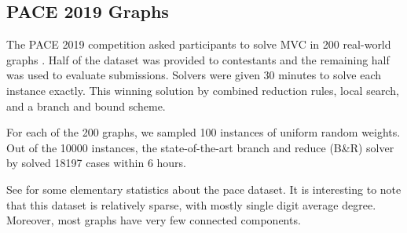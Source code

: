 \documentclass{article}
\begin{document}
\subsection{PACE 2019 Graphs}
The PACE 2019 competition asked participants to solve MVC in 200 real-world graphs \citet{pace2019}.
Half of the dataset was provided to contestants and the remaining half was used to evaluate submissions.
Solvers were given 30 minutes to solve each instance exactly.
This winning solution by \citet{wegotyoucovered} combined reduction rules,
local search, and a branch and bound scheme.

For each of the 200 graphs, we sampled 100 instances of uniform random weights.
Out of the 10000 instances,  
the state-of-the-art branch and reduce (B\&R) solver by \citet{kamis} solved 18197 cases within 6 hours.

See  for some elementary statistics about the pace dataset.
It is interesting to note that this dataset is relatively sparse,
with mostly single digit average degree.
Moreover, most graphs have very few connected components.
\end{document}
